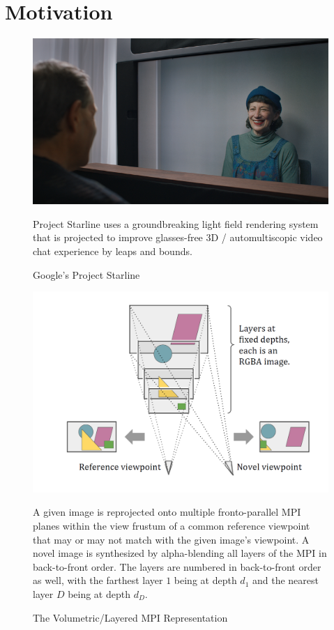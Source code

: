 \section{Motivation}\label{sec:motivation} 

\begin{figure}[!h]
    \includegraphics[width=1\columnwidth]{figures/google-starline-416.png}
    \caption{Google's Project Starline~\cite{bavor_project_2021,lawrence_project_2021}}
    \label{fig:google-starline}
    {\small Project Starline uses a groundbreaking light field rendering system that is projected to improve glasses-free 3D / automultiscopic video chat experience by leaps and bounds.}
\end{figure}

\begin{figure}[!h]
    \includegraphics[width=1\columnwidth]{figures/mpi-layered-representation.png}
    \caption{The Volumetric/Layered MPI Representation~\cite{zhou2018stereo}}
    \label{fig:mpi-layered-representation}
    {\small A given image is reprojected onto multiple fronto-parallel MPI planes within the view frustum of a common reference viewpoint that may or may not match with the given image's viewpoint. A novel image is synthesized by alpha-blending all layers of the MPI in back-to-front order. The layers are numbered in back-to-front order as well, with the farthest layer $1$ being at depth $d_1$ and the nearest layer $D$ being at depth $d_D$.}
\end{figure}

